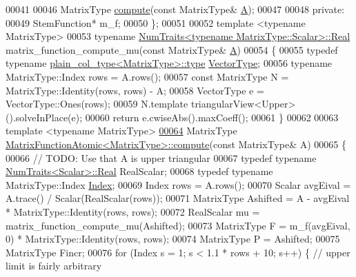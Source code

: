 \begin{DoxyCode}
00041 
00046     MatrixType \hyperlink{class_eigen_1_1internal_1_1_matrix_function_atomic_a704ccdc87d66cb6f93d16e0a0b9e8acf}{compute}(\textcolor{keyword}{const} MatrixType& \hyperlink{group___core___module_class_eigen_1_1_matrix}{A});
00047 
00048   \textcolor{keyword}{private}:
00049     StemFunction* m\_f;
00050 \};
00051 
00052 \textcolor{keyword}{template} <\textcolor{keyword}{typename} MatrixType>
00053 \textcolor{keyword}{typename} \hyperlink{group___core___module_struct_eigen_1_1_num_traits}{NumTraits<typename MatrixType::Scalar>::Real} 
      matrix\_function\_compute\_mu(\textcolor{keyword}{const} MatrixType& \hyperlink{group___core___module_class_eigen_1_1_matrix}{A})
00054 \{
00055   \textcolor{keyword}{typedef} \textcolor{keyword}{typename} \hyperlink{struct_eigen_1_1internal_1_1plain__col__type}{plain\_col\_type<MatrixType>::type} 
      \hyperlink{struct_vector_type}{VectorType};
00056   \textcolor{keyword}{typename} MatrixType::Index rows = A.rows();
00057   \textcolor{keyword}{const} MatrixType N = MatrixType::Identity(rows, rows) - A;
00058   VectorType e = VectorType::Ones(rows);
00059   N.template triangularView<Upper>().solveInPlace(e);
00060   \textcolor{keywordflow}{return} e.cwiseAbs().maxCoeff();
00061 \}
00062 
00063 \textcolor{keyword}{template} <\textcolor{keyword}{typename} MatrixType>
\hyperlink{class_eigen_1_1internal_1_1_matrix_function_atomic_a704ccdc87d66cb6f93d16e0a0b9e8acf}{00064} MatrixType \hyperlink{class_eigen_1_1internal_1_1_matrix_function_atomic_a704ccdc87d66cb6f93d16e0a0b9e8acf}{MatrixFunctionAtomic<MatrixType>::compute}(\textcolor{keyword}{const} 
      MatrixType& A)
00065 \{
00066   \textcolor{comment}{// TODO: Use that A is upper triangular}
00067   \textcolor{keyword}{typedef} \textcolor{keyword}{typename} \hyperlink{group___core___module_struct_eigen_1_1_num_traits}{NumTraits<Scalar>::Real} RealScalar;
00068   \textcolor{keyword}{typedef} \textcolor{keyword}{typename} MatrixType::Index \hyperlink{namespace_eigen_a62e77e0933482dafde8fe197d9a2cfde}{Index};
00069   Index rows = A.rows();
00070   Scalar avgEival = A.trace() / Scalar(RealScalar(rows));
00071   MatrixType Ashifted = A - avgEival * MatrixType::Identity(rows, rows);
00072   RealScalar mu = matrix\_function\_compute\_mu(Ashifted);
00073   MatrixType F = m\_f(avgEival, 0) * MatrixType::Identity(rows, rows);
00074   MatrixType P = Ashifted;
00075   MatrixType Fincr;
00076   \textcolor{keywordflow}{for} (Index s = 1; s < 1.1 * rows + 10; s++) \{ \textcolor{comment}{// upper limit is fairly arbitrary}

\end{DoxyCode}
